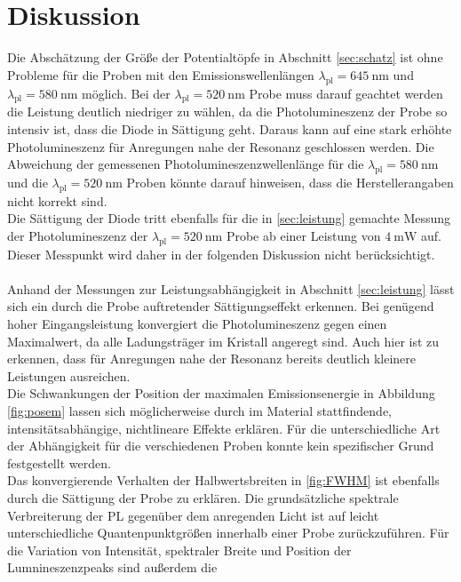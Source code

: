 \section{Diskussion}
Die Abschätzung der Größe der Potentialtöpfe in Abschnitt \ref{sec:schatz} ist ohne Probleme
für die Proben mit den Emissionswellenlängen $\lambda_{\text{pl}} = \SI{645}{\nano\meter}$
und $\lambda_{\text{pl}} = \SI{580}{\nano\meter}$ möglich. Bei der $\lambda_{\text{pl}} = \SI{520}{\nano\meter}$
Probe muss darauf geachtet werden die Leistung deutlich niedriger zu wählen, da die Photolumineszenz der Probe
so intensiv ist, dass die Diode in Sättigung geht. Daraus kann auf eine stark erhöhte Photolumineszenz für
Anregungen nahe der Resonanz geschlossen werden. Die Abweichung der gemessenen Photolumineszenzwellenlänge für die $\lambda_{\text{pl}} = \SI{580}{\nano\meter}$ und die $\lambda_{\text{pl}} = \SI{520}{\nano\meter}$ Proben könnte darauf hinweisen, dass die Herstellerangaben nicht korrekt sind.\\
Die Sättigung der Diode tritt ebenfalls für die in \ref{sec:leistung}
gemachte Messung der Photolumineszenz der $\lambda_{\text{pl}} = \SI{520}{\nano\meter}$ Probe ab
einer Leistung von $\SI{4}{\milli\watt}$ auf. Dieser Messpunkt wird daher in der folgenden Diskussion nicht berücksichtigt.\\
\\
Anhand der Messungen zur Leistungsabhängigkeit in Abschnitt \ref{sec:leistung} lässt sich ein
durch die Probe auftretender Sättigungseffekt erkennen. Bei genügend hoher Eingangsleistung
konvergiert die Photolumineszenz gegen einen Maximalwert, da alle Ladungsträger im Kristall
angeregt sind. Auch hier ist zu erkennen, dass für Anregungen nahe der Resonanz bereits
deutlich kleinere Leistungen ausreichen.\\
Die Schwankungen der Position der maximalen Emissionsenergie in Abbildung \ref{fig:posem}
lassen sich möglicherweise durch im Material stattfindende, intensitätsabhängige, nichtlineare
Effekte erklären. Für die unterschiedliche Art der Abhängigkeit für die verschiedenen Proben konnte
kein spezifischer Grund festgestellt werden.\\
Das konvergierende Verhalten der Halbwertsbreiten in \ref{fig:FWHM} ist ebenfalls durch
die Sättigung der Probe zu erklären. Die grundsätzliche spektrale Verbreiterung der PL
gegenüber dem anregenden Licht ist auf leicht unterschiedliche Quantenpunktgrößen
innerhalb einer Probe zurückzuführen. Für die Variation von Intensität,
spektraler Breite und Position der Lumnineszenzpeaks sind außerdem die
